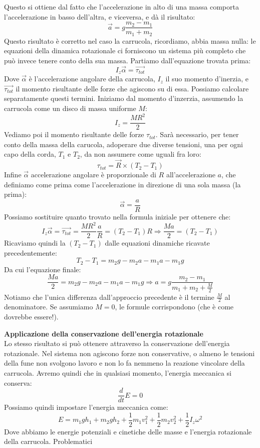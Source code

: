 \documentclass[a4paper,12pt]{article}
\begin{document}
Questo si ottiene dal fatto che l'accelerazione in alto di una massa comporta l'accelerazione in basso dell'altra, e viceversa, e dà
il risultato:
$$ \vec{a} = g \frac{m_2-m_1}{m_1+m_2} $$
Questo risultato è corretto nel caso la carrucola, ricordiamo, abbia massa nulla: le equazioni della dinamica rotazionale ci forniscono
un sistema più completo che può invece tenere conto della sua massa. Partiamo dall'equazione trovata prima:
$$ I_z \vec{\alpha} = \vec{\tau_{tot}} $$
Dove $\vec{\alpha}$ è l'accelerazione angolare della carrucola, $I_z$ il suo momento d'inerzia, e $\vec{\tau_{tot}}$ il momento risultante delle
forze che agiscono su di essa. Possiamo calcolare separatamente questi termini. Iniziamo dal momento d'inzerzia, assumendo la carrucola
come un disco di massa uniforme $M$:
$$ I_z = \frac{MR^2}{2}$$
Vediamo poi il momento risultante delle forze $\tau_{tot}$. Sarà necessario, per tener conto della massa della carucola, adoperare due diverse tensioni,
una per ogni capo della corda, $T_1$ e $T_2$, da non assumere come uguali fra loro:
$$ \tau_{tot} = \vec{R} \times (T_2-T_1)$$
Infine $\vec{\alpha}$ accelerazione angolare è proporzionale di $R$ all'accelerazione $a$, che definiamo come prima come l'accelerazione in direzione di una sola massa
(la prima):
$$ \vec{\alpha} = \frac{a}{R} $$
Possiamo sostituire quanto trovato nella formula iniziale per ottenere che:
$$ I_z \vec{\alpha} = \vec{\tau_{tot}} = \frac{MR^2}{2} \frac{a}{R} = (T_2-T_1)R \Rightarrow \frac{Ma}{2} = (T_2 - T_1)$$
Ricaviamo quindi la $(T_2-T_1)$ dalle equazioni dinamiche ricavate precedentemente:
$$ T_2-T_1 = m_2g-m_2a-m_1a-m_1g$$
Da cui l'equazione finale:
$$ \frac{Ma}{2} =  m_2g-m_2a-m_1a-m_1g \Rightarrow a = g\frac{m_2-m_1}{m_1+m_2+\frac{M}{2}}$$
Notiamo che l'unica differenza dall'approccio precedente è il termine $\frac{M}{2}$ al denominatore. Se assumiamo $M = 0$, le formule
corrispondono (che è come dovrebbe essere!).
\par\smallskip
\textbf{Applicazione della conservazione dell'energia rotazionale} \\
Lo stesso risultato si può ottenere attraverso la conservazione dell'energia rotazionale. Nel sistema non agiscono
forze non conservative, o almeno le tensioni della fune non svolgono lavoro e non lo fa nemmeno la reazione vincolare della carrucola.
Avremo quindi che in qualsiasi momento, l'energia meccanica si conserva:
$$ \frac{d}{dt}E = 0 $$
Possiamo quindi impostare l'energia meccanica come:
$$ E = m_1gh_1 + m_2gh_2 + \frac{1}{2}m_1v_1^2 + \frac{1}{2}m_2v_2^2 + \frac{1}{2}I_z\omega^2 $$
Dove abbiamo le energie potenziali e cinetiche delle masse e l'energia rotazionale della carrucola. Problematici
\end{document}
